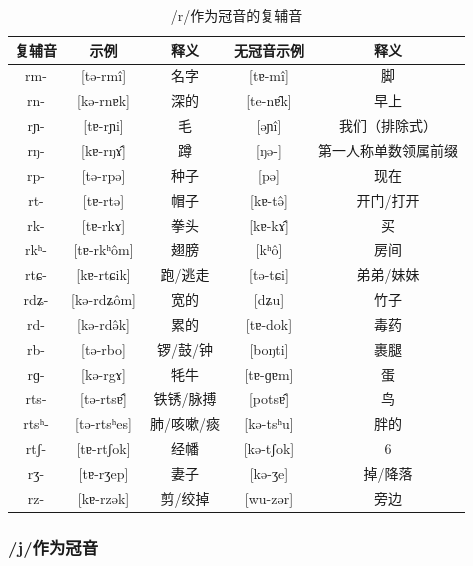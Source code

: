\begin{table}[H]
\vspace{5pt}
    \centering
    \caption{/r/作为冠音的复辅音}
    \label{rpre}
\begin{tabular}{c|cccc}
     \toprule
复辅音   & 示例              & 释义   & 无冠音示例          & 释义        \\
     \midrule
	rm-   & {[}tə-rmî{]}   & 名字     & {[}tɐ-mî{]}  & 脚          \\
rn-   & {[}kə-rnɐk{]}   & 深的     & {[}te-nɐ̂k{]} & 早上         \\
rɲ-   & {[}tɐ-rɲi{]}    & 毛      & {[}əɲî{]}    & 我们（排除式）    \\
rŋ-   & {[}kɐ-rŋɤ̂{]}   & 蹲      & {[}ŋə-{]}     & 第一人称单数领属前缀 \\
rp-   & {[}tə-rpə{]}    & 种子     & {[}pə{]}      & 现在         \\
rt-   & {[}tɐ-rtə{]}    & 帽子     & {[}kɐ-tə̂{]}  & 开门/打开      \\
rk-   & {[}tɐ-rkɤ{]}    & 拳头     & {[}kɐ-kɤ̂{]}  & 买          \\
rkʰ-  & {[}tɐ-rkʰôm{]} & 翅膀     & {[}kʰô{]}    & 房间         \\
rtɕ-  & {[}kɐ-rtɕik{]}  & 跑/逃走   & {[}tə-tɕi{]}  & 弟弟/妹妹      \\
rdʑ-  & {[}kə-rdʑôm{]} & 宽的     &   {[}dʑu{]}         & 竹子 \\
rd-   & {[}kə-rdə̂k{]}  & 累的     & {[}tɐ-dok{]}  & 毒药         \\
rb-   & {[}tə-rbo{]}    & 锣/鼓/钟  & {[}boŋti{]}   & 裹腿         \\
rɡ-   & {[}kə-rgɤ{]}    & 牦牛     & {[}tɐ-ɡɐm{]}  & 蛋          \\
rts-  & {[}tə-rtsɐ̂{]}  & 铁锈/脉搏  & {[}potsɐ̂{]}  & 鸟          \\
rtsʰ- & {[}tə-rtsʰes{]} & 肺/咳嗽/痰 & {[}kə-tsʰu{]} & 胖的         \\
rtʃ-  & {[}tɐ-rtʃok{]}  & 经幡     & {[}kə-tʃok{]} & 6          \\
rʒ-   & {[}tɐ-rʒep{]}   & 妻子     & {[}kə-ʒe{]}   & 掉/降落       \\
rz-   & {[}kɐ-rzək{]}   & 剪/绞掉   & {[}wu-zər{]}  & 旁边        \\
   \bottomrule
\end{tabular}
\end{table}

\subsubsection{/j/作为冠音}

